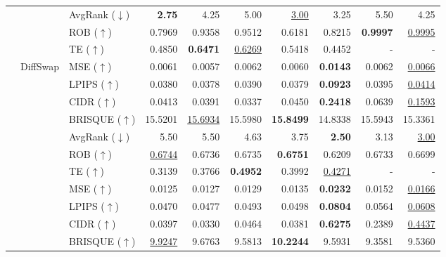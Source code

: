 \documentclass{article}
\begin{document}
\begin{table}[h!]
\begin{tabular}{lllrrrrrrr}
& & AvgRank ($\downarrow$) & \textbf{2.75} & 4.25 & 5.00 & \underline{3.00} & 3.25 & 5.50 & 4.25 \\

\cmidrule(lr){3-10}

& & ROB ($\uparrow$) & 0.7969 & 0.9358 & 0.9512 & 0.6181 & 0.8215 & \textbf{0.9997} & \underline{0.9995} \\
& & TE ($\uparrow$) & 0.4850 & \textbf{0.6471} & \underline{0.6269} & 0.5418 & 0.4452 & - & -\\

\cmidrule(lr){2-10}

& \multirow{9}{*}{DiffSwap}
& MSE ($\uparrow$) & 0.0061 & 0.0057 & 0.0062 & 0.0060 & \textbf{0.0143} & 0.0062 & \underline{0.0066} \\
& & LPIPS ($\uparrow$) & 0.0380 & 0.0378 & 0.0390 & 0.0379 & \textbf{0.0923} & 0.0395 & \underline{0.0414} \\
& & CIDR ($\uparrow$) & 0.0413 & 0.0391 & 0.0337 & 0.0450 & \textbf{0.2418} & 0.0639 & \underline{0.1593} \\
& & BRISQUE ($\uparrow$) & 15.5201 & \underline{15.6934} & 15.5980 & \textbf{15.8499} & 14.8338 & 15.5943 & 15.3361 \\
\cmidrule(lr){3-10}

& & AvgRank ($\downarrow$) & 5.50 & 5.50 & 4.63 & 3.75 & \textbf{2.50} & 3.13 & \underline{3.00} \\

\cmidrule(lr){3-10}

& & ROB ($\uparrow$) & \underline{0.6744} & 0.6736 & 0.6735 & \textbf{0.6751} & 0.6209 & 0.6733 & 0.6699 \\
& & TE ($\uparrow$) & 0.3139 & 0.3766 & \textbf{0.4952} & 0.3992 & \underline{0.4271} & - & -\\

\cmidrule(lr){2-10}

& \multirow{9}{*}{DiffFace}
& MSE ($\uparrow$) & 0.0125 & 0.0127 & 0.0129 & 0.0135 & \textbf{0.0232} & 0.0152 & \underline{0.0166} \\
& & LPIPS ($\uparrow$) & 0.0470 & 0.0477 & 0.0493 & 0.0498 & \textbf{0.0804} & 0.0564 & \underline{0.0608} \\
& & CIDR ($\uparrow$) & 0.0397 & 0.0330 & 0.0464 & 0.0381 & \textbf{0.6275} & 0.2389 & \underline{0.4437} \\
& & BRISQUE ($\uparrow$) & \underline{9.9247} & 9.6763 & 9.5813 & \textbf{10.2244} & 9.5931 & 9.3581 & 9.5360\\
\cmidrule(lr){3-10}


\end{tabular}
\end{table}
\end{document}
